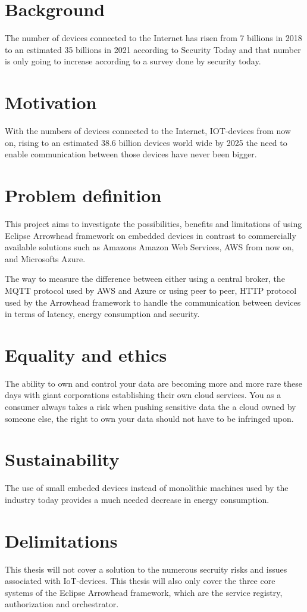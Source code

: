 \section{Background}
The number of devices connected to the Internet has risen from 7 billions in 2018 to an estimated 35 billions in 2021 according to Security Today and that number is only going to increase according to a survey done by security today. \cite{ST2020}
\section{Motivation}
With the numbers of devices connected to the Internet, IOT-devices from now on, rising to an estimated 38.6 billion devices world wide by 2025 the need to enable communication between those devices have never been bigger.
\section{Problem definition}
This project aims to investigate the possibilities, benefits and limitations of using Eclipse Arrowhead framework on embedded devices in contrast to commercially available solutions such
as Amazons Amazon Web Services, AWS 
from now on, and Microsofts Azure. 
 
The way to measure the difference between either 
using a central broker, the MQTT protocol used by AWS and Azure or using peer to peer, 
HTTP protocol used by the Arrowhead framework to handle the communication between devices in terms of latency, 
energy consumption and
security.
\section{Equality and ethics}
The ability to own and control your data are becoming more and more rare these days with giant corporations establishing their own cloud services.
You as a consumer always takes a risk when pushing sensitive data the a cloud owned by someone else, the right to own your data should not have to be infringed upon. 
\section{Sustainability}
The use of small embeded devices instead of monolithic machines used by the industry today provides a much needed decrease in energy consumption.
\section{Delimitations}
This thesis will not cover a solution to the numerous secruity risks and issues associated with IoT-devices. 
This thesis will also only cover the three core systems of the Eclipse Arrowhead framework, which are the service registry, authorization and orchestrator. 
